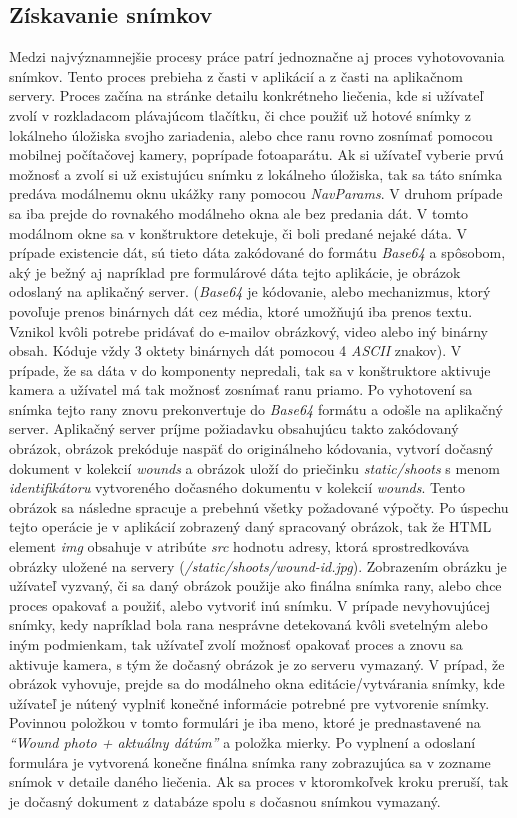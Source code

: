 \subsection{Získavanie snímkov}
Medzi najvýznamnejšie procesy práce patrí jednoznačne aj proces vyhotovovania snímkov. Tento proces prebieha z časti v aplikácií a z časti na aplikačnom servery. Proces začína na stránke detailu konkrétneho liečenia, kde si užívateľ zvolí v rozkladacom plávajúcom tlačítku, či chce použiť už hotové snímky z lokálneho úložiska svojho zariadenia, alebo chce ranu rovno zosnímať pomocou mobilnej počítačovej kamery, poprípade fotoaparátu. Ak si užívateľ vyberie prvú možnosť a zvolí si už existujúcu snímku z lokálneho úložiska, tak sa táto snímka predáva modálnemu oknu ukážky rany pomocou \textit{NavParams}. V druhom prípade sa iba prejde do rovnakého modálneho okna ale bez predania dát. V tomto modálnom okne sa v konštruktore detekuje, či boli predané nejaké dáta. V prípade existencie dát, sú tieto dáta zakódované do formátu \textit{Base64} a spôsobom, aký je bežný aj napríklad pre formulárové dáta tejto aplikácie, je obrázok odoslaný na aplikačný server. (\textit{Base64} je kódovanie, alebo mechanizmus, ktorý povoľuje prenos binárnych dát cez média, ktoré umožňujú iba prenos textu. Vznikol kvôli potrebe pridávať do e-mailov obrázkový, video alebo iný binárny obsah. Kóduje vždy 3 oktety binárnych dát pomocou 4 \textit{ASCII} znakov). V prípade, že sa dáta v do komponenty nepredali, tak sa v konštruktore aktivuje kamera a užívatel má tak možnosť zosnímať ranu priamo. Po vyhotovení sa snímka tejto rany znovu prekonvertuje do \textit{Base64} formátu a odošle na aplikačný server. Aplikačný server príjme požiadavku obsahujúcu takto zakódovaný obrázok, obrázok prekóduje naspäť do originálneho kódovania, vytvorí dočasný dokument v kolekcií \textit{wounds} a obrázok uloží do priečinku \textit{static/shoots} s menom \textit{identifikátoru} vytvoreného dočasného dokumentu v kolekcií \textit{wounds}. Tento obrázok sa následne spracuje a prebehnú všetky požadované výpočty. Po úspechu tejto operácie je v aplikácií zobrazený daný spracovaný obrázok, tak že HTML element \textit{img} obsahuje v atribúte \textit{src} hodnotu adresy, ktorá sprostredkováva obrázky uložené na servery (\textit{/static/shoots/wound-id.jpg}). Zobrazením obrázku je užívateľ vyzvaný, či sa daný obrázok použije ako finálna snímka rany, alebo chce proces opakovať a použiť, alebo vytvoriť inú snímku. V prípade nevyhovujúcej snímky, kedy napríklad bola rana nesprávne detekovaná kvôli svetelným alebo iným podmienkam, tak užívateľ zvolí možnosť opakovať proces a znovu sa aktivuje kamera, s tým že dočasný obrázok je zo serveru vymazaný. V prípad, že obrázok vyhovuje, prejde sa do modálneho okna editácie/vytvárania snímky, kde užívateľ je nútený vyplniť konečné informácie potrebné pre vytvorenie snímky. Povinnou položkou v tomto formulári je iba meno, ktoré je prednastavené na \textit{“Wound photo + aktuálny dátúm”} a položka mierky. Po vyplnení a odoslaní formulára je vytvorená konečne finálna snímka rany zobrazujúca sa v zozname snímok v detaile daného liečenia. Ak sa proces v ktoromkoľvek kroku preruší, tak je dočasný dokument z databáze spolu s dočasnou snímkou vymazaný.

